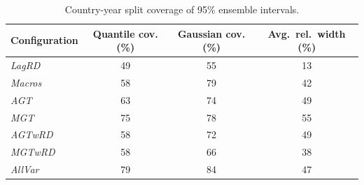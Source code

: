 \begin{table}[!htb]
\centering
\caption{Country-year split coverage of 95\% ensemble intervals.}
\label{tab:cy_coverage}
\begin{tabular}{l c c c}
\toprule
Configuration & Quantile cov. (\%) & Gaussian cov. (\%) & Avg.\ rel.\ width (\%) \\
\midrule
\textit{LagRD} & 49 & 55 & 13 \\
\textit{Macros} & 58 & 79 & 42 \\
\textit{AGT} & 63 & 74 & 49 \\
\textit{MGT} & 75 & 78 & 55 \\
\textit{AGTwRD} & 58 & 72 & 49 \\
\textit{MGTwRD} & 58 & 66 & 38 \\
\textit{AllVar} & 79 & 84 & 47 \\
\bottomrule
\end{tabular}
\end{table}
